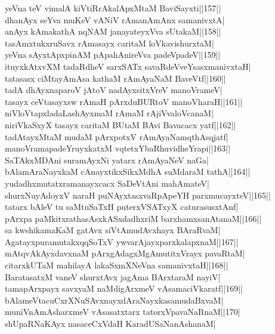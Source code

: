 \documentclass{article}
\begin{document}
yeVna teV vimalA kiVtiRrAkalApxMtaM BaviSayxti||157||\\
dhanAyx seYva muKeV vANiV rAmanAmAnx samanivxtA|\\
anAyx kAmakathA nqNAM janayateyxVva sUtakaM||158||\\
tasAmxtukxruSavx rAmasayx caritaM loVkavishurxtaM|\\
yeVna sAyxtApxpinAM pApahAnireVva padeVpadeV||159||\\
ituyxkAtxvXM tadaRdheV sarxSATx savaRdeVveYsasxmanivxtaH|\\
tatasasx ciMtayAmAsa kathaM rAmAyaNaM BaveVtf||160||\\
tadA dhAyxnaparoV jAtoV nadAyxsitxVreV manoVrameV|\\
tasayx ceVtasayxsw rAmaH pArxduBURtoV manoVharaH||161||\\
niVloVtapxladaLashAyxmaM rAmaM rAjiVvaloVcanaM|\\
niriVkaSxyX tasayx caritaM BUtaM BAvi Bavacacx yatf||162||\\
tadAtayxMtaM mudaM pArxpotxV rAmAyaNamqthAsqjatf|\\
manoVramapadeYruyxkatxM vqtetxYbaRhuvidheYrapi||163||\\
SaTAkxMDAni suramAyxNi yatarx rAmAyaNeV naGa|\\
bAlamAraNayxkaM cAnayxtikxSikxMdhA suMdaraM tathA||164||\\
yudadhxmutatxramanayxcacx SaDeVtAni mahAmateV|\\
shurxNuyAdoyxV naraH puNAyxtasxvaRpApeYH parxmucayxteV||165||\\
tatarx bAleV tu saMtuSaTxH puterxVSATxyX caturasusxtAnf|\\
pArxpa paMkitxrathasAsxkASxdadhxriM barxhamxsanAtanaM||166||\\
sa kwshikamaKaM gatAvx siVtAmudAvxhayx BAraRvaM|\\
AgatayxpuramutakxqqSoTxV ywvarAjayxparxkalapxnaM||167||\\
mAtqvAkAyxdavxnaM pArxgAdagxMgAmutitxVrayx pavaRtaM|\\
citarxkUTaM mahilayA lakaSxmXNeVna samanivxtaH||168||\\
BaratasatxM vaneV shurxtAvx jagAma BArxtaraM nayiV|\\
tamapArxpayx savxyaM naMdigArxmeV vAsamaciVkaratf||169||\\
bAlameVtacuCxrXNuSAvxnayxdAraNayxkasamudaBxvaM|\\
muniVnAmAsharxmeV vAsasatxtarx tatorxVpavaNaRnaM||170|\\
shUpaRNaKAyx nasaceCxVdaH KaradUSaNanAshanaM|\\
\end{document}
